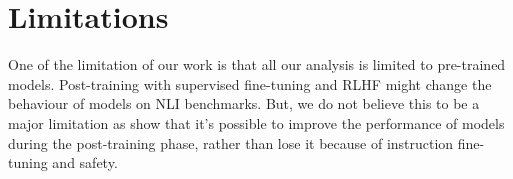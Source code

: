 \section{Limitations}

One of the limitation of our work is that all our analysis is limited to pre-trained models. Post-training with supervised fine-tuning and RLHF might change the behaviour of models on NLI benchmarks. But, we do not believe this to be a major limitation as \citet{dubey2024llama} show that it's possible to improve the performance of models during the post-training phase, rather than lose it because of instruction fine-tuning and safety.